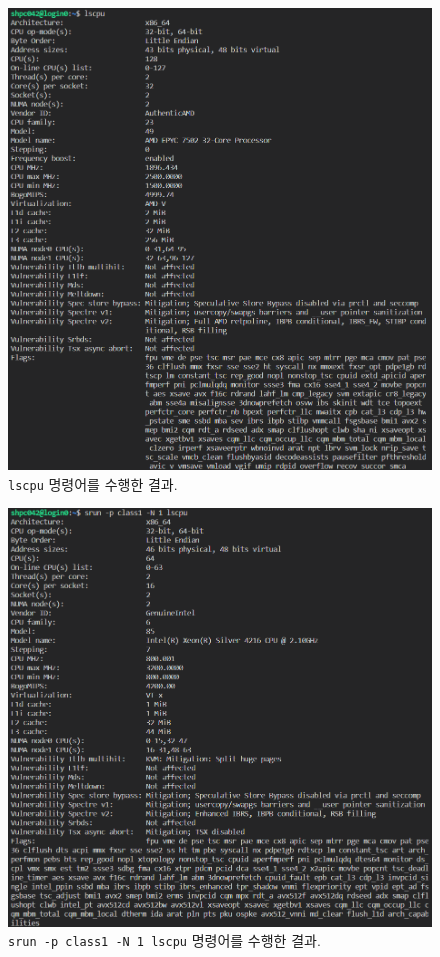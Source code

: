 \begin{enumerate}[label= (\alph*)]
{        \begin{figure}[t]
            \centering
            \includegraphics[width=\textwidth]{imgs/Figure09_lscpu.png}
            \caption{\label{fig:3-4}
                \texttt{lscpu} 명령어를 수행한 결과.
            }
        \end{figure}

        \begin{figure}[t]
            \centering
            \includegraphics[width=\textwidth]{imgs/Figure10_srun_lscpu.png}
            \caption{\label{fig:3-5}
                \texttt{srun -p class1 -N 1 lscpu} 명령어를 수행한 결과.
            }
        \end{figure}
    }

\end{enumerate}
